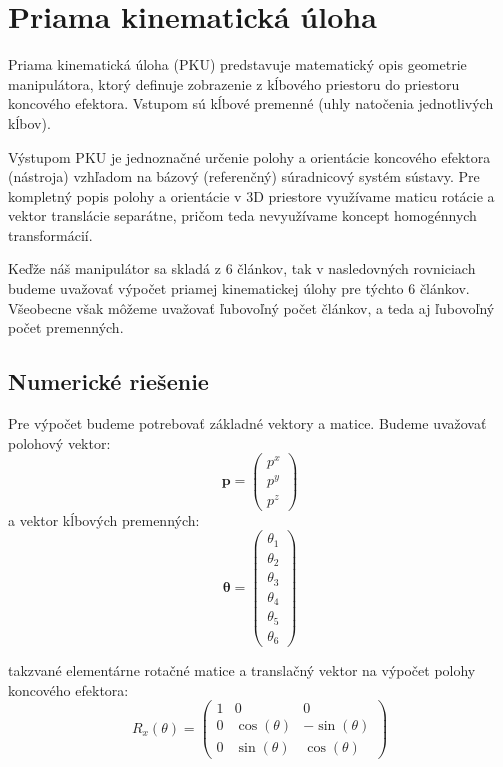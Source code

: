 \section{Priama kinematická úloha}
Priama kinematická úloha (PKU) predstavuje matematický opis geometrie manipulátora, ktorý definuje zobrazenie 
z kĺbového priestoru do priestoru koncového efektora. Vstupom sú kĺbové premenné (uhly natočenia jednotlivých 
kĺbov).

Výstupom PKU je jednoznačné určenie polohy a orientácie koncového efektora (nástroja) vzhľadom na bázový 
(referenčný) súradnicový systém sústavy. Pre kompletný popis polohy a orientácie v 3D priestore využívame 
maticu rotácie a vektor translácie separátne, pričom teda nevyužívame koncept homogénnych transformácií.

Keďže náš manipulátor sa skladá z 6 článkov, tak v nasledovných rovniciach budeme uvažovať 
výpočet priamej kinematickej úlohy pre týchto 6 článkov. Všeobecne však môžeme uvažovať ľubovoľný počet
článkov, a teda aj ľubovoľný počet premenných.

\subsection{Numerické riešenie}
Pre výpočet budeme potrebovať základné vektory a matice. Budeme uvažovať polohový vektor:
\begin{equation}
\mathbf{p} = \begin{pmatrix} p^x \\ p^y \\ p^z \end{pmatrix}
\end{equation}
a vektor kĺbových premenných:
\begin{equation}
\boldsymbol{\theta} = \begin{pmatrix} \theta_1 \\ \theta_2 \\ \theta_3 \\ \theta_4 \\ \theta_5 \\ \theta_6 \end{pmatrix}
\end{equation}

takzvané elementárne rotačné matice a translačný vektor na výpočet polohy koncového efektora:
\begin{equation}
R_x(\theta) = \begin{pmatrix} 1 & 0 & 0 \\ 0 & \cos(\theta) & -\sin(\theta) \\ 0 & \sin(\theta) & \cos(\theta) \end{pmatrix}
\end{equation}

